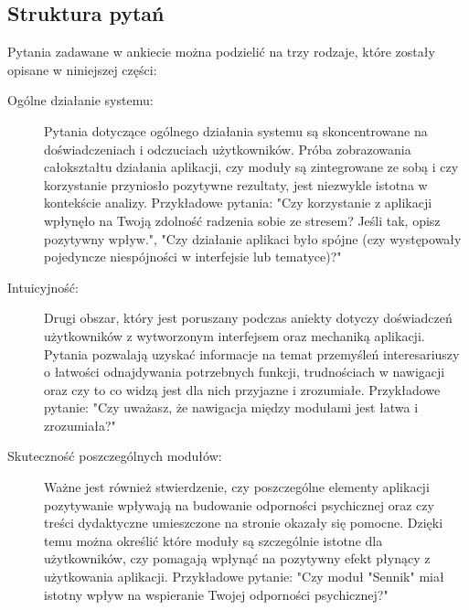 \subsection{Struktura pytań}
Pytania zadawane w ankiecie można podzielić na trzy rodzaje, które
zostały opisane w niniejszej części:
\begin{description}
    \item[Ogólne działanie systemu:] Pytania dotyczące ogólnego działania systemu 
    są skoncentrowane na doświadczeniach i odczuciach użytkowników. Próba 
    zobrazowania całokształtu działania aplikacji, czy moduły są zintegrowane
    ze sobą i czy korzystanie przyniosło pozytywne rezultaty, jest niezwykle istotna w kontekście analizy. 
    Przykładowe pytania: "Czy korzystanie z aplikacji wpłynęło na Twoją zdolność radzenia 
    sobie ze stresem? Jeśli tak, opisz pozytywny wpływ.", "Czy działanie aplikaci
    było spójne (czy występowały pojedyncze niespójności w interfejsie lub tematyce)?"
    \item[Intuicyjność:] Drugi obszar, który jest poruszany podczas aniekty dotyczy doświadczeń użytkowników z wytworzonym interfejsem oraz mechaniką aplikacji. Pytania pozwalają uzyskać informacje na temat przemyśleń interesariuszy o łatwości odnajdywania potrzebnych funkcji, trudnościach w nawigacji oraz czy to co widzą jest dla nich przyjazne i zrozumiałe. Przykładowe pytanie:
    "Czy uważasz, że nawigacja między modułami jest łatwa i zrozumiała?"
    \item[Skuteczność poszczególnych modułów:] Ważne jest również stwierdzenie, czy poszczególne elementy aplikacji pozytywanie wpływają na budowanie odporności psychicznej oraz czy treści dydaktyczne umieszczone na stronie okazały się pomocne. Dzięki temu można określić które moduły są szczególnie istotne dla użytkowników, czy pomagają wpłynąć na pozytywny efekt płynący z użytkowania aplikacji. Przykładowe pytanie: "Czy moduł "Sennik" miał istotny wpływ na wspieranie Twojej odporności psychicznej?"
\end{description}
